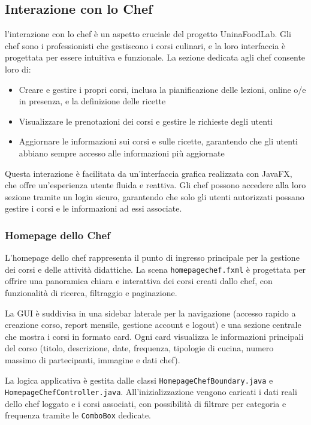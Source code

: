 \subsection{Interazione con lo Chef}
l'interazione con lo chef è un aspetto cruciale del progetto UninaFoodLab. Gli chef sono i professionisti che gestiscono i corsi culinari, e la loro interfaccia è progettata per essere intuitiva e funzionale.
La sezione dedicata agli chef consente loro di:
\begin{itemize}
    \item Creare e gestire i propri corsi, inclusa la pianificazione delle lezioni, online o/e in presenza, e la definizione delle ricette
    \item Visualizzare le prenotazioni dei corsi e gestire le richieste degli utenti
    \item Aggiornare le informazioni sui corsi e sulle ricette, garantendo che gli utenti abbiano sempre accesso alle informazioni più aggiornate
\end{itemize}
Questa interazione è facilitata da un'interfaccia grafica realizzata con JavaFX, che offre un'esperienza utente fluida e reattiva. Gli chef possono accedere alla loro sezione tramite un login sicuro, garantendo che solo gli utenti autorizzati possano gestire i corsi e le informazioni ad essi associate.

\subsubsection{Homepage dello Chef}

L'homepage dello chef rappresenta il punto di ingresso principale per la gestione dei corsi e delle attività didattiche. La scena \texttt{homepagechef.fxml} è progettata per offrire una panoramica chiara e interattiva dei corsi creati dallo chef, con funzionalità di ricerca, filtraggio e paginazione.

La GUI è suddivisa in una sidebar laterale per la navigazione (accesso rapido a creazione corso, report mensile, gestione account e logout) e una sezione centrale che mostra i corsi in formato card. Ogni card visualizza le informazioni principali del corso (titolo, descrizione, date, frequenza, tipologie di cucina, numero massimo di partecipanti, immagine e dati chef).

La logica applicativa è gestita dalle classi \texttt{HomepageChefBoundary.java} e \texttt{HomepageChefController.java}. All'inizializzazione vengono caricati i dati reali dello chef loggato e i corsi associati, con possibilità di filtrare per categoria e frequenza tramite le \texttt{ComboBox} dedicate.

